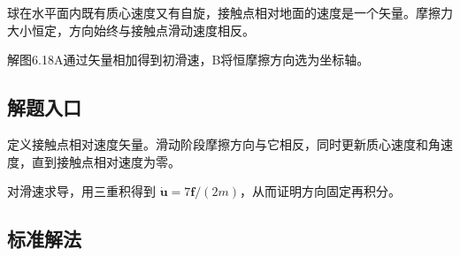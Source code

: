 \documentclass[UTF8,fontset=fandol,a4paper,11pt]{ctexart}
\begin{document}
球在水平面内既有质心速度又有自旋，接触点相对地面的速度是一个矢量。摩擦力大小恒定，方向始终与接触点滑动速度相反。

解图6.18A通过矢量相加得到初滑速，B将恒摩擦方向选为坐标轴。



\subsection*{解题入口}

定义接触点相对速度矢量。滑动阶段摩擦方向与它相反，同时更新质心速度和角速度，直到接触点相对速度为零。

对滑速求导，用三重积得到 $\dot{\boldsymbol u}=7\boldsymbol f/(2m)$，从而证明方向固定再积分。



\subsection*{标准解法}
\end{document}
